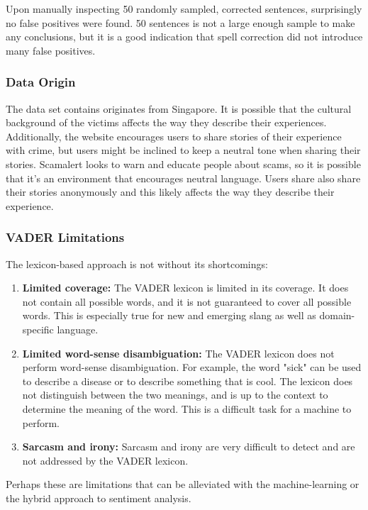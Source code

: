 Upon manually inspecting 50 randomly sampled, corrected sentences, surprisingly no false positives were found. 50 sentences is not a large enough sample to make any conclusions, but it is a good indication that spell correction did not introduce many false positives.

\subsubsection*{Data Origin}

The data set contains originates from Singapore. It is possible that the cultural background of the victims affects the way they describe their experiences. Additionally, the website encourages users to share stories of their experience with crime, but users might be inclined to keep a neutral tone when sharing their stories. Scamalert looks to warn and educate people about scams, so it is possible that it's an environment that encourages neutral language. Users share also share their stories anonymously and this likely affects the way they describe their experience.

\subsubsection*{VADER Limitations}

The lexicon-based approach is not without its shortcomings: 

\begin{enumerate}
    \item \textbf{Limited coverage:} The VADER lexicon is limited in its coverage. It does not contain all possible words, and it is not guaranteed to cover all possible words. This is especially true for new and emerging slang as well as domain-specific language.
    \item \textbf{Limited word-sense disambiguation:} The VADER lexicon does not perform word-sense disambiguation. For example, the word "sick" can be used to describe a disease or to describe something that is cool. The lexicon does not distinguish between the two meanings, and is up to the context to determine the meaning of the word. This is a difficult task for a machine to perform.
    \item \textbf{Sarcasm and irony:} Sarcasm and irony are very difficult to detect and are not addressed by the VADER lexicon.
\end{enumerate}

Perhaps these are limitations that can be alleviated with the machine-learning or the hybrid approach to sentiment analysis.
